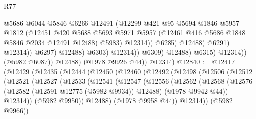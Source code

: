 \begin{lexlean}{R77}
\begin{coremodule}
                                            @5686
                                            @6044
                                            @5846
                                            @6266
                                            @12491
                                            (@12299
                                              @421
                                              @95
                                              @5694
                                              @1846
                                              @5957
                                              @1812
                                              (@12451
                                                @420
                                                @5688
                                                @5693
                                                @5971
                                                @5957
                                                (@12461 @416 @5686 @1848 @5846 @2034 @12491 @12488)
                                                @5983)
                                              @12314))
                                          @6285)
                                        @12488)
                                      @6291)
                                    @12314))
                                @6297)
                              @12488)
                            @6303)
                          @12314))
                      @6309)
                    @12488)
                  @6315)
                @12314))
            (@5982 @6087))
          @12488)
        (@1978 @9926 @44))
      @12314)
@12840 := @12417
    (@12429
      (@12435
        (@12444
          (@12450
            (@12460
              (@12492
                (@12498
                  (@12506
                    (@12512
                      (@12521
                        (@12527
                          (@12533
                            (@12541
                              (@12547
                                (@12556
                                  (@12562
                                    (@12568
                                      (@12576
                                        (@12582 (@12591 @12775 (@5982 @9934)) @12488)
                                        (@1978 @9942 @44))
                                      @12314))
                                  (@5982 @9950))
                                @12488)
                              (@1978 @9958 @44))
                            @12314))
                        (@5982 @9966))

\end{coremodule}
\end{lexlean}
